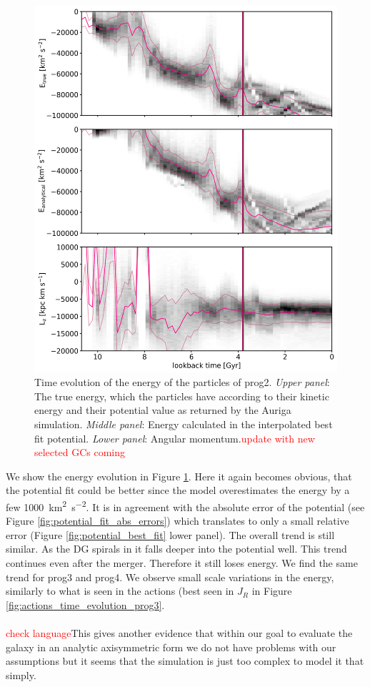 \begin{figure}[htbp]
\captionsetup{format=plain}
    \centering
	\includegraphics[width=\textwidth]{plots/Dynamics/prog2/energy_time_evolution_hist_mean.png}
	\caption{Time evolution of the energy of the particles of prog2. \textit{Upper panel}: The true energy, which the particles have according to their kinetic energy and their potential value as returned by the Auriga simulation. \textit{Middle panel}: Energy calculated in the interpolated best fit potential. \textit{Lower panel}: Angular momentum.\textcolor{red}{update with new selected GCs coming}}\label{fig:energy_time_evolution_prog2}
\end{figure}

We show the energy evolution in Figure \ref{fig:energy_time_evolution_prog2}. Here it again becomes obvious, that the potential fit could be better since the model overestimates the energy by a few \SI{1000}{km^{2}.s^{-2}}. It is in agreement with the absolute error of the potential (see Figure \ref{fig:potential_fit_abs_errors}) which translates to only a small relative error (Figure \ref{fig:potential_best_fit} lower panel). The overall trend is still similar. As the \ac{DG} spirals in it falls deeper into the potential well. This trend continues even after the merger. Therefore it still loses energy. We find the same trend for prog3 and prog4. We observe small scale variations in the energy, similarly to what is seen in the actions (best seen in $J_R$ in Figure \ref{fig:actions_time_evolution_prog3}.
\\\\\textcolor{red}{check language}This gives another evidence that within our goal to evaluate the galaxy in an analytic axisymmetric form we do not have problems with our assumptions but it seems that the simulation is just too complex to model it that simply.

